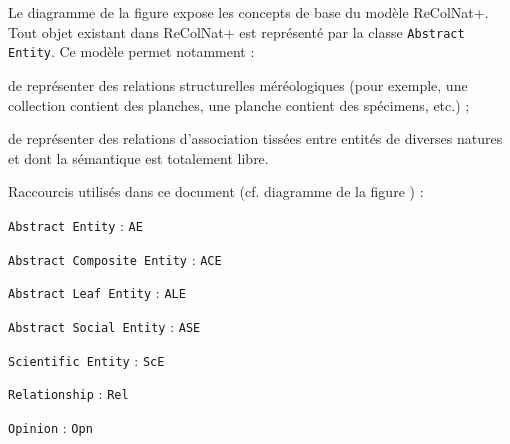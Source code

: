 Le diagramme de la figure  expose les concepts de base du modèle ReColNat+.
Tout objet existant dans ReColNat+ est représenté par la classe {\tt Abstract Entity}.
Ce modèle permet notamment :

\startitemize
	\item
	de représenter des relations structurelles méréologiques (pour exemple, une collection contient des planches, une planche contient des spécimens, etc.) ;
	\item
	de représenter des relations d'association tissées entre entités de diverses natures et dont la sémantique est totalement libre.
\stopitemize


Raccourcis utilisés dans ce document (cf. diagramme de la figure ) :

\startitemize
	\item {\tt Abstract Entity} : {\tt AE}
	\item {\tt Abstract Composite Entity} : {\tt ACE}
	\item {\tt Abstract Leaf Entity} : {\tt ALE}
	\item {\tt Abstract Social Entity} : {\tt ASE}
	\item {\tt Scientific Entity} : {\tt ScE}
	\item {\tt Relationship} : {\tt Rel}
	\item {\tt Opinion} : {\tt Opn}
\stopitemize